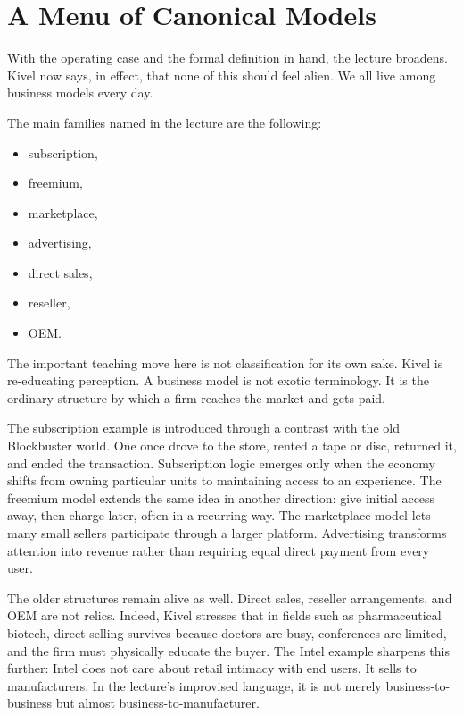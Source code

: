\section{A Menu of Canonical Models}

With the operating case and the formal definition in hand, the lecture broadens. Kivel now says, in effect, that none of this should feel alien. We all live among business models every day.

The main families named in the lecture are the following:
\begin{itemize}
\item subscription,
\item freemium,
\item marketplace,
\item advertising,
\item direct sales,
\item reseller,
\item OEM.
\end{itemize}

The important teaching move here is not classification for its own sake. Kivel is re-educating perception. A business model is not exotic terminology. It is the ordinary structure by which a firm reaches the market and gets paid.

The subscription example is introduced through a contrast with the old Blockbuster world. One once drove to the store, rented a tape or disc, returned it, and ended the transaction. Subscription logic emerges only when the economy shifts from owning particular units to maintaining access to an experience. The freemium model extends the same idea in another direction: give initial access away, then charge later, often in a recurring way. The marketplace model lets many small sellers participate through a larger platform. Advertising transforms attention into revenue rather than requiring equal direct payment from every user.

The older structures remain alive as well. Direct sales, reseller arrangements, and OEM are not relics. Indeed, Kivel stresses that in fields such as pharmaceutical biotech, direct selling survives because doctors are busy, conferences are limited, and the firm must physically educate the buyer. The Intel example sharpens this further: Intel does not care about retail intimacy with end users. It sells to manufacturers. In the lecture's improvised language, it is not merely business-to-business but almost business-to-manufacturer.

